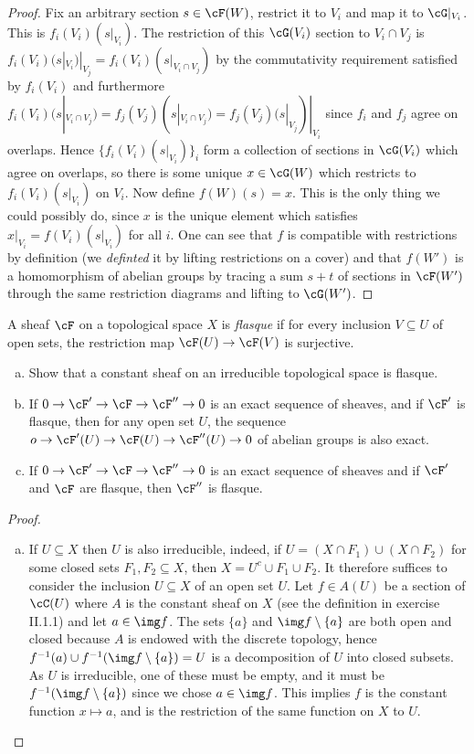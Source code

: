 \begin{problemset}
\begin{proof}
		Fix an arbitrary section $s \in \cF(W)$, restrict it to $V_i$ and map it to $\cG|_{V_i}$. This is $f_i(V_i)(s|_{V_i})$. The restriction of this $\cG(V_i)$ section to $V_i\cap V_j$ is $f_i(V_i)(s|_{V_i})|_{V_j} = f_i(V_i)(s|_{V_i\cap V_j})$ by the commutativity requirement satisfied by $f_i(V_i)$ and furthermore $f_i(V_i)(s|_{V_i\cap V_j}) = f_j(V_j)(s|_{V_i\cap V_j}) = f_j(V_j)(s|_{V_j})|_{V_i}$ since $f_i$ and $f_j$ agree on overlaps. Hence $\{f_i(V_i)(s|_{V_i})\}_i$ form a collection of sections in $\cG(V_i)$ which agree on overlaps, so there is some unique $x \in \cG(W)$ which restricts to $f_i(V_i)(s|_{V_i})$ on $V_i$. Now define $f(W)(s) = x$. This is the only thing we could possibly do, since $x$ is the unique element which satisfies $x|_{V_i} = f(V_i)(s|_{V_i})$ for all $i$. One can see that $f$ is compatible with restrictions by definition (we \emph{definted} it by lifting restrictions on a cover) and that $f(W')$ is a homomorphism of abelian groups by tracing a sum $s + t$ of sections in $\cF(W')$ through the same restriction diagrams and lifting to $\cG(W')$.
	\end{proof}
	\item A sheaf $\cF$ on a topological space $X$ is \emph{flasque} if for every inclusion $V\subseteq U$ of open sets, the restriction map $\cF(U) \to \cF(V)$ is surjective.
	\begin{enumerate}[(a)]
		\item Show that a constant sheaf on an irreducible topological space is flasque.
		\item If $0 \to \cF' \to \cF\to \cF''\to 0$ is an exact sequence of sheaves, and if $\cF'$ is flasque, then for any open set $U$, the sequence $o\to \cF'(U)\to \cF(U)\to \cF''(U)\to 0$ of abelian groups is also exact.
		\item If $0 \to \cF' \to \cF \to \cF''\to 0$ is an exact sequence of sheaves and if $\cF'$ and $\cF$ are flasque, then $\cF''$ is flasque.
	\end{enumerate}
	\begin{proof}$ $
		\begin{enumerate}[(a)]
			\item If $U \subseteq X$ then $U$ is also irreducible, indeed, if $U = (X\cap F_1)\cup (X \cap F_2)$ for some closed sets $F_1,F_2 \subseteq X$, then $X = U^c \cup F_1 \cup F_2$. It therefore suffices to consider the inclusion $U\subseteq X$ of an open set $U$. Let $f \in A(U)$ be a section of $\cC(U)$ where $A$ is the constant sheaf on $X$ (see the definition in exercise II.1.1) and let $a \in \img f$. The sets $\{a\}$ and $\img f\setminus \{a\}$ are both open and closed because $A$ is endowed with the discrete topology, hence $f^{-1}(a)\cup f^{-1}(\img f\setminus \{a\}) = U$ is a decomposition of $U$ into closed subsets. As $U$ is irreducible, one of these must be empty, and it must be $f^{-1}(\img f\setminus \{a\})$ since we chose $a\in \img f$. This implies $f$ is the constant function $x \mapsto a$, and is the restriction of the same function on $X$ to $U$.

\end{enumerate}
\end{proof}
\end{problemset}
